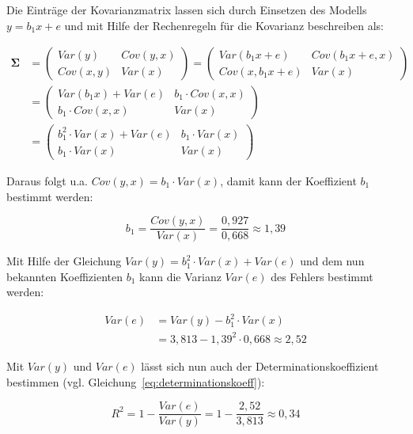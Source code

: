 \documentclass{article}
\numberwithin{equation}{section}
\begin{document}
Die Einträge der Kovarianzmatrix lassen sich durch Einsetzen des Modells $y = b_1 x + e$ und mit Hilfe der Rechenregeln für die Kovarianz beschreiben als:

\begin{equation}
\begin{split}
\boldsymbol\Sigma
&= \begin{pmatrix}
Var(y) & Cov(y,x)\\
Cov(x,y) & Var(x)
\end{pmatrix}
= \begin{pmatrix}
Var(b_1 x + e) & Cov(b_1 x + e,x)\\
Cov(x,b_1 x + e) & Var(x)
\end{pmatrix}\\
&= \begin{pmatrix}
Var(b_1 x) + Var(e) & b_1 \cdot Cov(x,x)\\
b_1 \cdot Cov(x,x) & Var(x)
\end{pmatrix}\\
&= \begin{pmatrix}
b^2_1 \cdot Var(x) + Var(e) & b_1 \cdot Var(x)\\
b_1 \cdot Var(x) & Var(x)
\end{pmatrix}
\end{split}
\end{equation}

Daraus folgt u.a. $Cov(y,x) = b_1 \cdot Var(x)$, damit kann der Koeffizient $b_1$ bestimmt werden:

\begin{equation}
b_1 = \frac{Cov(y,x)}{Var(x)} = \frac{0,927}{0,668} \approx 1,39
\end{equation}

Mit Hilfe der Gleichung $Var(y) = b^2_1 \cdot Var(x) + Var(e)$ und dem nun bekannten Koeffizienten $b_1$ kann die Varianz $Var(e)$ des Fehlers bestimmt werden:

\begin{equation}
\begin{split}
Var(e) &= Var(y) - b^2_1 \cdot Var(x)\\
&= 3,813 - 1,39^2 \cdot 0,668 \approx 2,52
\end{split}
\end{equation}

Mit $Var(y)$ und $Var(e)$ lässt sich nun auch der Determinationskoeffizient bestimmen (vgl. Gleichung~\ref{eq:determinationskoeff}):

\begin{equation}
R^2 = 1 - \frac{Var(e)}{Var(y)} = 1- \frac{2,52}{3,813} \approx 0,34
\end{equation}
\end{document}
